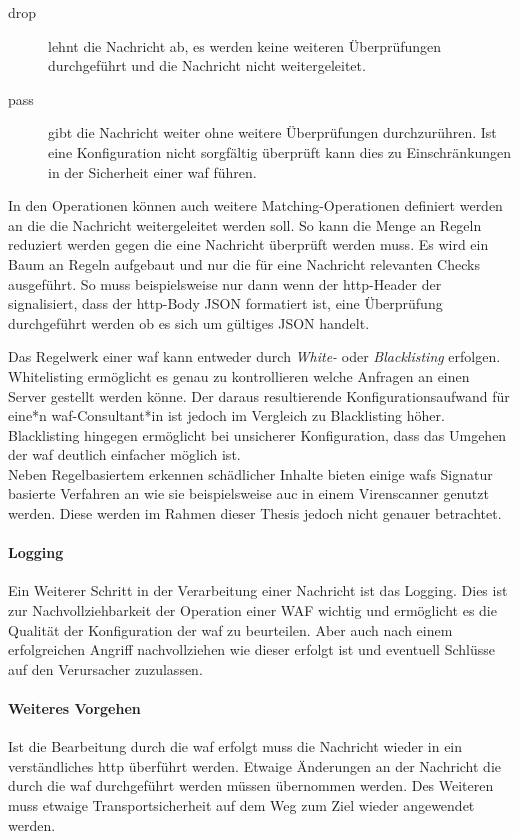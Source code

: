 \begin{description}
    \item[drop] lehnt die Nachricht ab, es werden keine weiteren Überprüfungen durchgeführt und die Nachricht nicht weitergeleitet.
    \item[pass] gibt die Nachricht weiter ohne weitere Überprüfungen durchzurühren.
    Ist eine Konfiguration nicht sorgfältig überprüft kann dies zu Einschränkungen in der Sicherheit einer \ac{waf} führen.
\end{description}

In den Operationen können auch weitere Matching-Operationen definiert werden an die die Nachricht weitergeleitet werden soll.
So kann die Menge an Regeln reduziert werden gegen die eine Nachricht überprüft werden muss.
Es wird ein Baum an Regeln aufgebaut und nur die für eine Nachricht relevanten Checks ausgeführt.
So muss beispielsweise nur dann wenn der \ac{http}-Header der signalisiert, dass der \ac{http}-Body JSON formatiert ist, eine Überprüfung durchgeführt werden ob es sich um gültiges JSON handelt.

Das Regelwerk einer \ac{waf} kann entweder durch \textit{White-} oder \textit{Blacklisting} erfolgen.
Whitelisting ermöglicht es genau zu kontrollieren welche Anfragen an einen Server gestellt werden könne.
Der daraus resultierende Konfigurationsaufwand für eine*n \ac{waf}-Consultant*in ist jedoch im Vergleich zu Blacklisting höher.
Blacklisting hingegen ermöglicht bei unsicherer Konfiguration, dass das Umgehen der \ac{waf} deutlich einfacher möglich ist.\\

Neben Regelbasiertem erkennen schädlicher Inhalte bieten einige \acp{waf} Signatur basierte Verfahren an wie sie beispielsweise auc in einem Virenscanner genutzt werden.
Diese werden im Rahmen dieser Thesis jedoch nicht genauer betrachtet.

\paragraph{Logging}
Ein Weiterer Schritt in der Verarbeitung einer Nachricht ist das Logging.
Dies ist zur Nachvollziehbarkeit der Operation einer WAF wichtig und ermöglicht es die Qualität der Konfiguration der \ac{waf} zu beurteilen.
Aber auch nach einem erfolgreichen Angriff nachvollziehen wie dieser erfolgt ist und eventuell Schlüsse auf den Verursacher zuzulassen.

\paragraph{Weiteres Vorgehen}
Ist die Bearbeitung durch die \ac{waf} erfolgt muss die Nachricht wieder in ein verständliches \ac{http} überführt werden.
Etwaige Änderungen an der Nachricht die durch die \ac{waf} durchgeführt werden müssen übernommen werden.
Des Weiteren muss etwaige Transportsicherheit auf dem Weg zum Ziel wieder angewendet werden.\\

